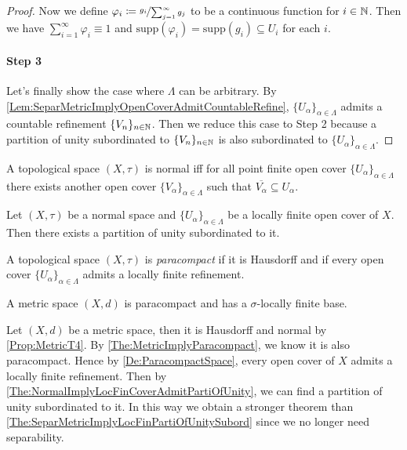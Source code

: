 \documentclass[screen,single]{techreport}
\numberwithin{equation}{section}
\begin{document}
\begin{proof}
  Now we define $\varphi_i \coloneqq \nicefrac{g_i}{\sum_{j=1}^\infty g_j}$ to be a continuous function for $i \in \mathbb{N}$.
  Then we have $\sum_{i=1}^\infty \varphi_i \equiv 1$ and $\mathrm{supp}(\varphi_i) = \mathrm{supp}(g_i) \subseteq U_i$ for each $i$.
  
  \paragraph{Step 3}
  Let's finally show the case where $\Lambda$ can be arbitrary.
  By \cref{Lem:SeparMetricImplyOpenCoverAdmitCountableRefine}, $\{U_\alpha\}_{\alpha \in \Lambda}$ admits a countable refinement $\{V_n\}_{n \in \mathbb{N}}$.
  Then we reduce this case to Step 2 because a partition of unity subordinated to $\{V_n\}_{n \in \mathbb{N}}$ is also subordinated to $\{U_\alpha\}_{\alpha \in \Lambda}$.
\end{proof}

\begin{lemma}\label{Lem:NormalIffAnyPointFinCoverAdmitClosRefineCover}
  A topological space $(X,\tau)$ is normal iff for all point finite open cover $\{U_\alpha\}_{\alpha \in \Lambda}$ there exists another open cover $\{V_\alpha\}_{\alpha \in \Lambda}$ such that $\overline{V_\alpha} \subseteq U_\alpha$.
\end{lemma}

\begin{theorem}\label{The:NormalImplyLocFinCoverAdmitPartiOfUnity}
  Let $(X,\tau)$ be a normal space and $\{U_\alpha\}_{\alpha \in \Lambda}$ be a locally finite open cover of $X$.
  Then there exists a partition of unity subordinated to it.
\end{theorem}

\begin{definition}\label{De:ParacompactSpace}
  A topological space $(X,\tau)$ is \emph{paracompact} if it is Hausdorff and if every open cover $\{U_\alpha\}_{\alpha \in \Lambda}$ admits a locally finite refinement.
\end{definition}

\begin{theorem}\label{The:MetricImplyParacompact}
  A metric space $(X,d)$ is paracompact and has a $\sigma$-locally finite base.
\end{theorem}

\begin{remark}\label{Rem:StrongerThmByParacompact}
  Let $(X,d)$ be a metric space, then it is Hausdorff and normal by \cref{Prop:MetricT4}.
  By \cref{The:MetricImplyParacompact}, we know it is also paracompact.
  Hence by \cref{De:ParacompactSpace}, every open cover of $X$ admits a locally finite refinement.
  Then by \cref{The:NormalImplyLocFinCoverAdmitPartiOfUnity}, we can find a partition of unity subordinated to it.
  In this way we obtain a stronger theorem than \cref{The:SeparMetricImplyLocFinPartiOfUnitySubord} since we no longer need separability.
\end{remark}
\end{document}
